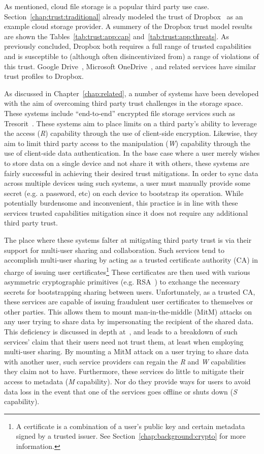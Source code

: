 As mentioned, cloud file storage is a popular third party use
case. Section~\ref{chap:trust:traditional} already modeled the trust
of Dropbox~\cite{dropbox} as an example cloud storage provider. A
summery of the Dropbox trust model results are shown the
Tables~\ref{tab:trust:app:cap} and~\ref{tab:trust:app:threats}. As
previously concluded, Dropbox both requires a full range of trusted
capabilities and is susceptible to (although often disincentivized
from) a range of violations of this trust. Google
Drive~\cite{google-drive}, Microsoft
OneDrive~\cite{microsoft-onedrive}, and related services have similar
trust profiles to Dropbox.

As discussed in Chapter~\ref{chap:related}, a number of systems have
been developed with the aim of overcoming third party trust challenges
in the storage space. These systems include ``end-to-end'' encrypted
file storage services such as Tresorit~\cite{tresorit}. These systems
aim to place limits on a third party's ability to leverage the access
(\emph{R}) capability through the use of client-side
encryption. Likewise, they aim to limit third party access to the
manipulation (\emph{W}) capability through the use of client-side data
authentication. In the base case where a user merely wishes to store
data on a single device and not share it with others, these systems
are fairly successful in achieving their desired trust mitigations. In
order to sync data across multiple devices using such systems, a user
must manually provide some secret (e.g. a password, etc) on each
device to bootstrap its operation. While potentially burdensome and
inconvenient, this practice is in line with these services trusted
capabilities mitigation since it does not require any additional third
party trust.

The place where these systems falter at mitigating third party trust
is via their support for multi-user sharing and collaboration. Such
services tend to accomplish multi-user sharing by acting as a trusted
certificate authority (CA) in charge of issuing user
certificates\footnote{A certificate is a combination of a user's
  public key and certain metadata signed by a trusted issuer. See
  Section~\ref{chap:background:crypto} for more information.} These
certificates are then used with various asymmetric cryptographic
primitives (e.g. RSA~\cite{rivest1978}) to exchange the necessary
secrets for bootstrapping sharing between users. Unfortunately, as a
trusted CA, these services are capable of issuing fraudulent user
certificates to themselves or other parties. This allows them to mount
man-in-the-middle (MitM) attacks on any user trying to share data by
impersonating the recipient of the shared data. This deficiency is
discussed in depth at~\cite{wilson2014}, and leads to a breakdown of
such services' claim that their users need not trust them, at least
when employing multi-user sharing. By mounting a MitM attack on a user
trying to share data with another user, such service providers can
regain the \emph{R} and \emph{W} capabilities they claim not to
have. Furthermore, these services do little to mitigate their access
to metadata (\emph{M} capability). Nor do they provide ways for users
to avoid data loss in the event that one of the services goes offline
or shuts down (\emph{S} capability).

